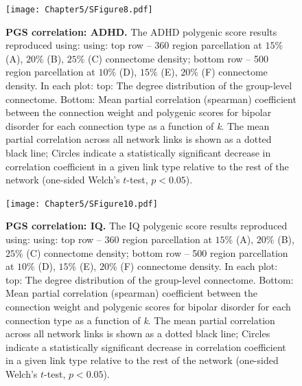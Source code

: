 \begin{figure}[h!]
\begin{center}
\texttt{[image: Chapter5/SFigure8.pdf]}%
\end{center}
\caption{\textbf{PGS correlation: ADHD.} 
The ADHD polygenic score results reproduced using: using: top row -- 360 region parcellation at $15\%$ (A), $20\%$ (B), $25\%$ (C) connectome density; bottom row -- 500 region parcellation at $10\%$ (D), $15\%$ (E), $20\%$ (F) connectome density. In each plot: top: The degree distribution of the group-level connectome. Bottom: Mean partial correlation (spearman) coefficient between the connection weight and polygenic scores for bipolar disorder for each connection type as a function of \textit{k}. The mean partial correlation across all network links is shown as a dotted black line; Circles indicate a statistically significant decrease in correlation coefficient in a given link type relative to the rest of the network (one-sided Welch's $t$-test, $p < 0.05$).}
\label{fig:Ch5SFig8}
\end{figure}

\begin{figure}[h!]
\begin{center}
\texttt{[image: Chapter5/SFigure10.pdf]}%
\end{center}
\caption{\textbf{PGS correlation: IQ.} 
The IQ polygenic score results reproduced using: using: top row -- 360 region parcellation at $15\%$ (A), $20\%$ (B), $25\%$ (C) connectome density; bottom row -- 500 region parcellation at $10\%$ (D), $15\%$ (E), $20\%$ (F) connectome density. In each plot: top: The degree distribution of the group-level connectome. Bottom: Mean partial correlation (spearman) coefficient between the connection weight and polygenic scores for bipolar disorder for each connection type as a function of \textit{k}. The mean partial correlation across all network links is shown as a dotted black line; Circles indicate a statistically significant decrease in correlation coefficient in a given link type relative to the rest of the network (one-sided Welch's $t$-test, $p < 0.05$).}
\label{fig:Ch5SFig10}
\end{figure}
 

